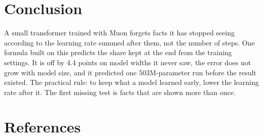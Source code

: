 \documentclass{article}
\begin{document}
\section{Conclusion}

A small transformer trained with Muon forgets facts it has stopped seeing according to the learning rate summed after them, not the number of steps. One formula built on this predicts the share kept at the end from the training settings. It is off by 4.4 points on model widths it never saw, the error does not grow with model size, and it predicted one 503M-parameter run before the result existed. The practical rule: to keep what a model learned early, lower the learning rate after it. The first missing test is facts that are shown more than once.

\section*{References}
\end{document}
